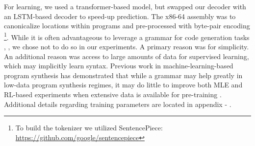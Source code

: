 \documentclass{article}
\begin{document}
For learning, we used a transformer-based model, but swapped our decoder with an LSTM-based decoder to speed-up prediction. 
The x86-64 assembly was to canonicalize locations within programs and pre-processed  with byte-pair encoding \citep{sennrich2015neural} \footnote{To build the tokenizer we utilized SentencePiece: \url{https://github.com/google/sentencepiece}}. 
While it is often advantageous to leverage a grammar for code generation tasks \cite{yin-neubig-2017-syntactic}, \cite{parisotto2016neuro}, we chose not to do so in our experiments. A primary reason was for simplicity. An additional reason was access to large amounts of data for supervised learning, which may implicitly learn syntax. Previous work in machine-learning-based program synthesis has demonstrated that while a grammar may help greatly in low-data program synthesis regimes, it may do little to improve both MLE and RL-based experiments when extensive data is available for pre-training \cite{bunel2018leveraging}. Additional details regarding training parameters are located in appendix - . 
 




\end{document}
